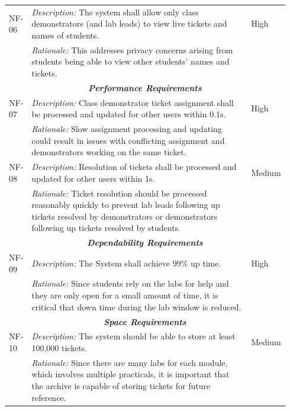 \documentclass[a4paper,11pt]{article}
\begin{document}
\begin{table}[H]
\begin{tabular}{|p{0.07\linewidth} | p{0.78\linewidth} |p{0.09\linewidth}|}
      \hline\hline
 NF-06 & \textit{Description:} The system shall allow only class demonstrators (and lab leads) to view live tickets and names of students. & High\\
  \cline{2-2}
  & \textit{Rationale:} This addresses privacy concerns arising from students being able to view other students' names and tickets. & \\
\hline
  
    \multicolumn{3}{c}{\textit{\textbf{Performance Requirements}}}\\
    
  \hline
   NF-07 & \textit{Description:} Class demonstrator ticket assignment shall be processed and updated for other users within 0.1s. & High \\
  \cline{2-2}
  & \textit{Rationale:} Slow assignment processing and updating could result in issues with conflicting assignment and demonstrators working on the same ticket. & \\
 
   \hline\hline
   NF-08 & \textit{Description:} Resolution of tickets shall be processed and updated for other users within 1s. & Medium \\
  \cline{2-2}
  & \textit{Rationale:} Ticket resolution should be processed reasonably quickly to prevent lab leads following up tickets resolved by demonstrators or demonstrators following up tickets resolved by students. & \\
  \hline
  
      \multicolumn{3}{c}{\textit{\textbf{Dependability Requirements}}}\\
  
   \hline
   NF-09 & \textit{Description:} The System shall achieve 99\% up time. & High \\
  \cline{2-2}
  & \textit{Rationale:} Since students rely on the labs for help and they are only open for a small amount of time, it is critical that down time during the lab window is reduced. & \\
\hline
   
\multicolumn{3}{c}{\textit{\textbf{Space Requirements}}}\\
   
   \hline
   NF-10 & \textit{Description:} The system should be able to store at least 100,000 tickets. & Medium \\
    \cline{2-2}
  & \textit{Rationale:} Since there are many labs for each module, which involves multiple practicals, it is important that the archive is capable of storing tickets for future reference. & \\
 \hline

\end{tabular}
\end{table}
\end{document}
